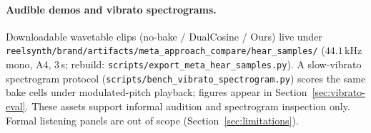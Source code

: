 
\paragraph{Audible demos and vibrato spectrograms.}
Downloadable wavetable clips (no-bake / DualCosine / Ours) live under
\texttt{reelsynth/brand/artifacts/meta\_approach\_compare/hear\_samples/}
($44.1$\,kHz mono, A4, $3$\,s; rebuild: \texttt{scripts/export\_meta\_hear\_samples.py}).
A slow-vibrato spectrogram protocol (\texttt{scripts/bench\_vibrato\_spectrogram.py})
scores the same bake cells under modulated-pitch playback; figures appear in Section~\ref{sec:vibrato-eval}.
These assets support informal audition and spectrogram inspection only.
Formal listening panels are out of scope (Section~\ref{sec:limitations}).
